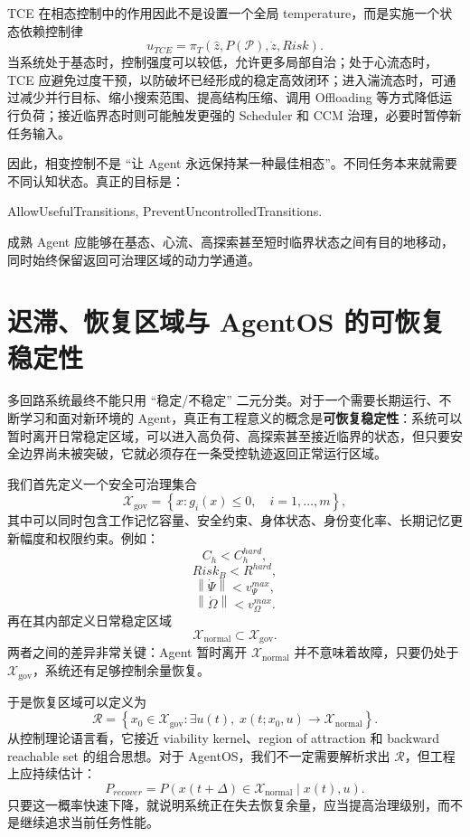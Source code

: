 TCE 在相态控制中的作用因此不是设置一个全局 temperature，而是实施一个状态依赖控制律
\[
u_{TCE}
=
\pi_T
\left(
\hat z,
P(\mathcal P),
\dot z,
Risk
\right).
\]
当系统处于基态时，控制强度可以较低，允许更多局部自治；处于心流态时，TCE 应避免过度干预，以防破坏已经形成的稳定高效闭环；进入湍流态时，可通过减少并行目标、缩小搜索范围、提高结构压缩、调用 Offloading 等方式降低运行负荷；接近临界态时则可能触发更强的 Scheduler 和 CCM 治理，必要时暂停新任务输入。

因此，相变控制不是 ``让 Agent 永远保持某一种最佳相态''。不同任务本来就需要不同认知状态。真正的目标是：
\begin{statementbox}
AllowUsefulTransitions,
PreventUncontrolledTransitions.
\end{statementbox}
成熟 Agent 应能够在基态、心流、高探索甚至短时临界状态之间有目的地移动，同时始终保留返回可治理区域的动力学通道。

\section{迟滞、恢复区域与 AgentOS 的可恢复稳定性}

多回路系统最终不能只用 ``稳定/不稳定'' 二元分类。对于一个需要长期运行、不断学习和面对新环境的 Agent，真正有工程意义的概念是\textbf{可恢复稳定性}：系统可以暂时离开日常稳定区域，可以进入高负荷、高探索甚至接近临界的状态，但只要安全边界尚未被突破，它就必须存在一条受控轨迹返回正常运行区域。

我们首先定义一个安全可治理集合
\[
\mathcal X_{\mathrm{gov}}
=
\left\{
x:
g_i(x)\leq0,
\quad i=1,\ldots,m
\right\},
\]
其中可以同时包含工作记忆容量、安全约束、身体状态、身份变化率、长期记忆更新幅度和权限约束。例如：
\[
C_h<C_h^{hard},
\]
\[
Risk_B<R^{hard},
\]
\[
\left\|\dot\Psi\right\|<v_\Psi^{max},
\]
\[
\left\|\dot\Omega\right\|<v_\Omega^{max}.
\]
再在其内部定义日常稳定区域
\[
\mathcal X_{\mathrm{normal}}
\subset
\mathcal X_{\mathrm{gov}}.
\]
两者之间的差异非常关键：Agent 暂时离开 $\mathcal X_{\mathrm{normal}}$ 并不意味着故障，只要仍处于 $\mathcal X_{\mathrm{gov}}$，系统还有足够控制余量恢复。

于是恢复区域可以定义为
\[
\mathcal R
=
\left\{
x_0\in\mathcal X_{\mathrm{gov}}
:
\exists u(t),
\;
x(t;x_0,u)
\rightarrow
\mathcal X_{\mathrm{normal}}
\right\}.
\]
从控制理论语言看，它接近 viability kernel、region of attraction 和 backward reachable set 的组合思想。对于 AgentOS，我们不一定需要解析求出 $\mathcal R$，但工程上应持续估计：
\[
P_{recover}
=
P
\left(
x(t+\Delta)\in\mathcal X_{\mathrm{normal}}
\mid x(t),u
\right).
\]
只要这一概率快速下降，就说明系统正在失去恢复余量，应当提高治理级别，而不是继续追求当前任务性能。

